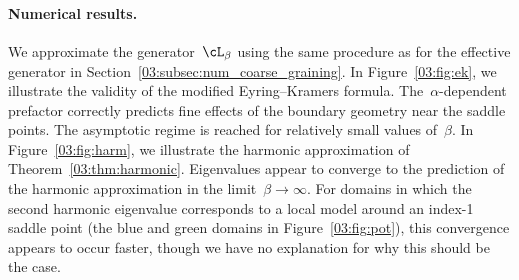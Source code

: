 \paragraph{Numerical results.}
We approximate the generator~$\cL_\beta$ using the same procedure as for the effective generator in Section~\ref{03:subsec:num_coarse_graining}.
In Figure~\ref{03:fig:ek}, we illustrate the validity of the modified Eyring--Kramers formula. The~$\alpha$-dependent prefactor correctly predicts fine effects of the boundary geometry near the saddle points. The asymptotic regime is reached for relatively small values of~$\beta$.
In Figure~\ref{03:fig:harm}, we illustrate the harmonic approximation of Theorem~\ref{03:thm:harmonic}. Eigenvalues appear to converge to the prediction of the harmonic approximation in the limit~$\beta\to\infty$. For domains in which the second harmonic eigenvalue corresponds to a local model around an index-1 saddle point (the blue and green domains in Figure~\ref{03:fig:pot}), this convergence appears to occur faster, though we have no explanation for why this should be the case.

